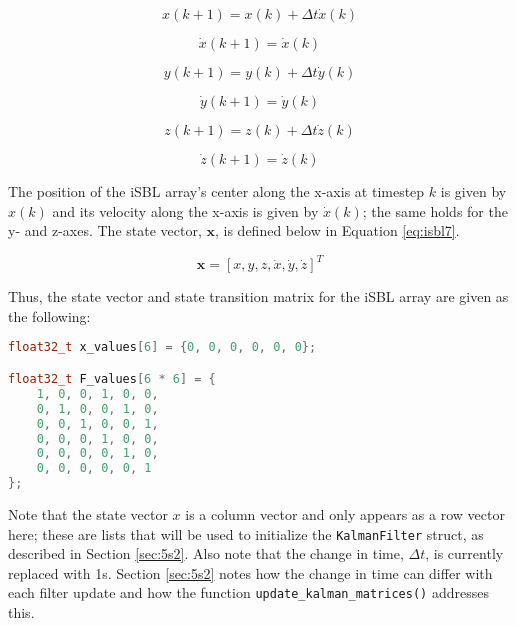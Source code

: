 \documentclass[12pt,a4paper]{report}
\begin{document}
\begin{equation} \label{eq:isbl1}
	x(k+1) = x(k) + \Delta t \dot{x}(k)
\end{equation}

\begin{equation} \label{eq:isbl2}
	\dot{x}(k+1) = \dot{x}(k)
\end{equation}

\begin{equation} \label{eq:isbl3}
	y(k+1) = y(k) + \Delta t \dot{y}(k)
\end{equation}

\begin{equation} \label{eq:isbl4}
	\dot{y}(k+1) = \dot{y}(k)
\end{equation}

\begin{equation} \label{eq:isbl5}
	z(k+1) = z(k) + \Delta t \dot{z}(k)
\end{equation}

\begin{equation} \label{eq:isbl6}
	\dot{z}(k+1) = \dot{z}(k)
\end{equation}

The position of the iSBL array’s center along the x-axis at timestep \(k\) is given by \(x(k)\) and its velocity along the x-axis is given by \(\dot{x}(k)\); the same holds for the y- and z-axes. The state vector, \(\mathbf{x}\), is defined below in Equation \ref{eq:isbl7}. 

\begin{equation} \label{eq:isbl7}
	\mathbf{x} = [x, y, z, \dot{x}, \dot{y}, \dot{z}]^T
\end{equation}

Thus, the state vector and state transition matrix for the iSBL array are given as the following:

\begin{lstlisting}[language=C++]
float32_t x_values[6] = {0, 0, 0, 0, 0, 0};

float32_t F_values[6 * 6] = {
	1, 0, 0, 1, 0, 0,
	0, 1, 0, 0, 1, 0,
	0, 0, 1, 0, 0, 1,
	0, 0, 0, 1, 0, 0,
	0, 0, 0, 0, 1, 0,
	0, 0, 0, 0, 0, 1
};
\end{lstlisting}

Note that the state vector \(x\) is a column vector and only appears as a row vector here; these are lists that will be used to initialize the \verb|KalmanFilter| struct, as described in Section \ref{sec:5s2}. Also note that the change in time, \(\Delta t\), is currently replaced with 1s. Section \ref{sec:5s2} notes how the change in time can differ with each filter update and how the function \verb|update_kalman_matrices()| addresses this.
\end{document}
